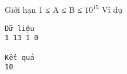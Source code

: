 Giới hạn  
1 ≤ A ≤ B ≤ $10^{15}$
   Ví dụ  
\begin{verbatim}
Dữ liệu
1 13 1 0

Kết quả
10
\end{verbatim}